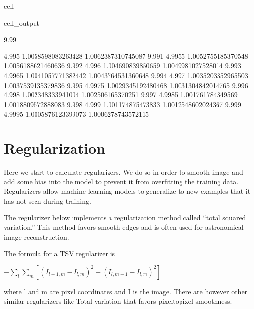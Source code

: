 \documentclass[letterpaper,10pt,english]{jupyterBook}
\begin{document}
\begin{sphinxuseclass}{cell}
\begin{sphinxVerbatimOutput}
\begin{sphinxuseclass}{cell_output}
\begin{sphinxVerbatim}[commandchars=\\\{\}]
9.99
\end{sphinxVerbatim}

\begin{sphinxVerbatim}[commandchars=\\\{\}]
 4.995 \PYGZhy{}1.0058598083263428 \PYGZhy{}1.0062387310745087
9.991 4.9955 \PYGZhy{}1.0052755185370548 \PYGZhy{}1.0056188621460636
9.992 4.996 \PYGZhy{}1.004690839850659 \PYGZhy{}1.0049981027528014
9.993 4.9965 \PYGZhy{}1.0041057771382442 \PYGZhy{}1.0043764531360648
9.994 4.997 \PYGZhy{}1.0035203352965503 \PYGZhy{}1.0037539135379836
9.995 4.9975 \PYGZhy{}1.0029345192480468 \PYGZhy{}1.0031304842014765
9.996 4.998 \PYGZhy{}1.002348333941004 \PYGZhy{}1.002506165370251
9.997 4.9985 \PYGZhy{}1.001761784349569 \PYGZhy{}1.0018809572888083
9.998 4.999 \PYGZhy{}1.001174875473833 \PYGZhy{}1.0012548602024367
9.999 4.9995 \PYGZhy{}1.0005876123399073 \PYGZhy{}1.0006278743572115
\end{sphinxVerbatim}

\end{sphinxuseclass}\end{sphinxVerbatimOutput}

\end{sphinxuseclass}

\section{Regularization}
\label{\detokenize{interpolation:regularization}}
\sphinxAtStartPar
Here we start to calculate regularizers. We do so in order to smooth image and add some bias into the model to prevent it from overfitting the training data. Regularizers allow machine learning models to generalize to new examples that it has not seen during training.

\sphinxAtStartPar
The regularizer below implements a regularization method called “total squared variation.” This method favors smooth edges and is often used for astronomical image reconstruction.

\sphinxAtStartPar
The formula for a TSV regularizer is

\sphinxAtStartPar
\(-\sum_l \sum_m[(I_{l+1,m}-I_{l,m})^2+(I_{l,m+1}-I_{l,m})^2]\)

\sphinxAtStartPar
where l and m are pixel coordinates and I is the image. There are however other similar regularizers like Total variation that favors pixel\sphinxhyphen{}to\sphinxhyphen{}pixel smoothness.
\end{document}
